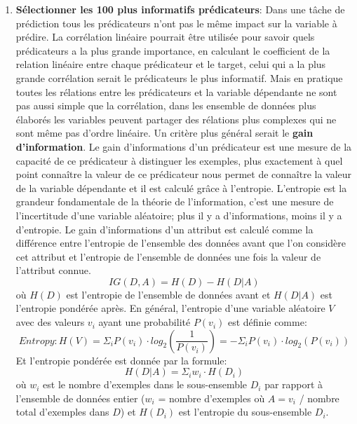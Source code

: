 \begin{enumerate}
    \item \textbf{Sélectionner les 100 plus informatifs prédicateurs}: Dans une tâche de prédiction tous les prédicateurs n'ont pas le même impact sur la variable à prédire. La corrélation linéaire pourrait être utilisée pour savoir quels prédicateurs a la plus grande importance, en calculant le coefficient de la relation linéaire entre chaque prédicateur et le target, celui qui a la plus grande corrélation serait le prédicateurs le plus informatif. Mais en pratique toutes les rélations entre les prédicateurs et la variable dépendante ne sont pas aussi simple que la corrélation, dans les ensemble de données plus élaborés les variables peuvent partager des rélations plus complexes qui ne sont même pas d'ordre linéaire. Un critère plus général serait le \textbf{gain d'information}. Le gain d'informations d'un prédicateur est une mesure de la capacité de ce prédicateur à distinguer les exemples, plus exactement à quel point connaître la valeur de ce prédicateur nous permet de connaître la valeur de la variable dépendante et il est calculé grâce à l'entropie. L'entropie est la grandeur fondamentale de la théorie de l'information, c'est une mesure de l'incertitude d'une variable aléatoire; plus il y a d’informations, moins il y a d’entropie. Le gain d'informations d'un attribut est calculé comme la différence entre l'entropie de l'ensemble des données avant que l'on considère cet attribut et l'entropie de l'ensemble de données une fois la valeur de l'attribut connue. \[IG (D, A) = H(D) - H(D | A)\] où \(H(D)\) est l'entropie de l'ensemble de données avant et \(H(D | A)\) est l'entropie pondérée après.
    En général, l'entropie d'une variable aléatoire \(V\) avec des valeurs \(v_i\) ayant une probabilité \(P(v_i)\) est définie comme: \[Entropy: H(V) = \Sigma_i P(v_i) \cdot log_2 (\frac{1}{P(v_i)}) = −\Sigma_i P(v_i) \cdot log_2 (P(v_i))\] Et l'entropie pondérée est donnée par la formule: \[H(D | A) = \Sigma_i w_i \cdot H(D_i)\] où \(w_i\) est le nombre d'exemples dans le sous-ensemble \(D_i\) par rapport à l'ensemble de données entier (\(w_i\) = nombre d'exemples où \(A = v_i\) / nombre total d'exemples dans \(D\)) et \(H(D_i)\) est l'entropie du sous-ensemble \(D_i\).
\end{enumerate}

